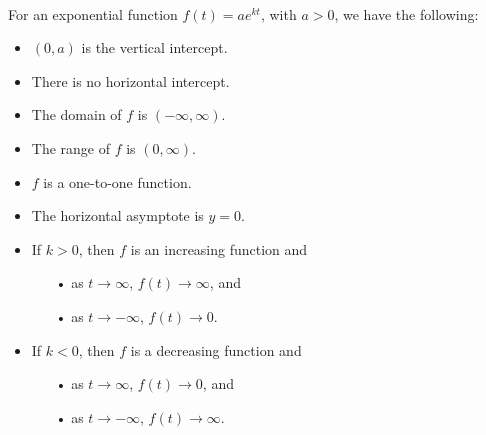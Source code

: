 \begin{myDefinition}[Key Characteristics of $\boldsymbol{f(t) = ae^{kt}}$:]~\\[0.5mm]
For an exponential function $f(t) = ae^{kt}$, with $a> 0$, we have the following:\\[3mm]
\begin{minipage}{0.6\linewidth}
	\begin{itemize}
	\setlength{\itemsep}{1mm}
		\item $(0,a)$ is the vertical intercept.
		\item There is no horizontal intercept.
		\item The domain of $f$ is $(-\infty, \infty)$.
		\item The range of $f$ is $(0,\infty)$.
		\item $f$ is a one-to-one function.
		\item The horizontal asymptote is $y=0$.
		\item If $k>0$, then $f$ is an increasing function and
			\begin{itemize}
			\setlength{\itemsep}{0in}
				\item[\small{•}] as $t\rightarrow \infty$, $f(t)\rightarrow \infty$, and
				\item[\small{•}] as $t\rightarrow -\infty$, $f(t)\rightarrow 0$.
			\end{itemize}	
		\item If $k<0$, then $f$ is a decreasing function and
			\begin{itemize}
			\setlength{\itemsep}{0in}
				\item[\small{•}] as $t\rightarrow \infty$, $f(t)\rightarrow 0$, and
				\item[\small{•}] as $t\rightarrow -\infty$, $f(t)\rightarrow \infty$.
			\end{itemize}	
	\end{itemize}
	\end{minipage}
	\begin{minipage}{0.4\linewidth}
			\begin{center}
			~\\[-0.8em]
				\label{fig:explog-def1}


\end{center}
\end{minipage}
\end{myDefinition}

